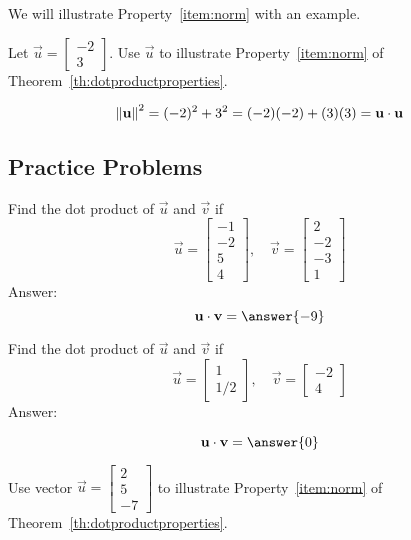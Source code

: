 \documentclass{ximera}
\begin{document}

We will illustrate Property~\ref{item:norm} with an example.
\begin{example}\label{ex:exprop6}
  Let $\vec{u}=\begin{bmatrix}-2\\3\end{bmatrix}$.  Use $\vec{u}$ to illustrate Property~\ref{item:norm} of Theorem~\ref{th:dotproductproperties}.
  \begin{explanation}
  
  $$\left\lVert\mathbf{u}\right\rVert^2=(-2)^2+3^2=(-2)(-2)+(3)(3)=\mathbf{u}\cdot\mathbf{u}$$
  \end{explanation}
\end{example}

\subsection*{Practice Problems}

\begin{problem}\label{prob:dotproduct1}
Find the dot product of $\vec{u}$ and $\vec{v}$ if
  $$\vec{u}=\begin{bmatrix}-1\\-2\\5\\4\end{bmatrix},\quad \vec{v}=\begin{bmatrix}2\\-2\\-3\\1\end{bmatrix}$$
  Answer:
  $$\vec{u} \dotp \vec{v} = \answer{-9}$$
\end{problem}

\begin{problem}\label{prob:dotproduct2}
Find the dot product of $\vec{u}$ and $\vec{v}$ if 
  $$\vec{u}=\begin{bmatrix}1\\1/2\end{bmatrix},\quad \vec{v}=\begin{bmatrix}-2\\4\end{bmatrix}$$
  Answer:
  
  $$\vec{u} \dotp \vec{v} = \answer{0}$$
\end{problem}

\begin{problem}\label{prob:dotproductprop6}
  Use vector $\vec{u}=\begin{bmatrix}2\\5\\-7\end{bmatrix}$ to
  illustrate Property~\ref{item:norm} of Theorem~\ref{th:dotproductproperties}.
\end{problem}
\end{document}
